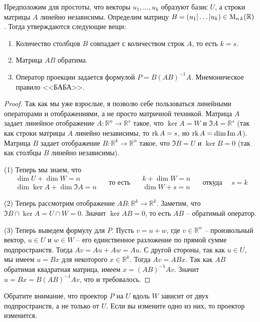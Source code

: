 Предположим для простоты, что векторы $u_1,\ldots,u_k$ образуют базис $U$, а строки матрицы $A$ линейно независимы. Определим матрицу $B = (u_1|\ldots|u_k)\in \operatorname{M}_{n\,k}(\mathbb R)$. Тогда утверждаются следующие вещи:
\begin{enumerate}
\item Количество столбцов $B$ совпадает с количеством строк $A$, то есть $k = s$.
\item Матрица $AB$ обратима.
\item Оператор проекции задается формулой $P = B(AB)^{-1}A$. Мнемоническое правило <<БАБА>>.
\end{enumerate}
\begin{proof}
Так как мы уже взрослые, я позволю себе пользоваться линейными операторами и отображениями, а не просто матричной техникой. Матрица $A$ задает линейное отображение $A\colon \mathbb R^n \to \mathbb R^s$ такое, что $\ker A = W$ и $\Im A = \mathbb R^s$ (так как строки матрицы $A$ линейно независимы, то $\operatorname{rk} A = s$, но $\operatorname{rk} A = \dim \operatorname{Im} A$). Матрица $B$ задает отображение $B\colon \mathbb R^k \to \mathbb R^n$ такое, что $\Im B = U$ и $\ker B = 0$ (так как столбцы $B$ линейно независимы). 

(1) Теперь мы знаем, что 
\[
\begin{aligned}
\dim U + \dim W = n\\
\dim \ker A + \dim \Im A = n
\end{aligned}
\quad\text{ то есть }\quad
\begin{aligned}
k + \dim W = n\\
\dim W+ s= n
\end{aligned}
\quad\text{ откуда }\quad
s = k
\]

(2) Теперь рассмотрим отображение $AB\colon \mathbb R^k \to \mathbb R^k$. Заметим, что $\Im B \cap \ker A = U \cap W = 0$. Значит $\ker AB = 0$, то есть $AB$ -- обратимый оператор.

(3) Теперь выведем формулу для $P$. Пусть $v = u + w$, где $v\in \mathbb R^n$ -- произвольный вектор, $u\in U$ и $w\in W$ -- его единственное разложение по прямой сумме подпространств. Тогда $Av = Au + Aw = Au$. С другой стороны, так как $u\in U$, мы имеем $u = B x$ для некоторого $x\in \mathbb R^k$. Тогда $Av = ABx$. Так как $AB$ обратимая квадратная матрица, имеем $x = (AB)^{-1}Av$. Значит $u = Bx = B(AB)^{-1}Av$, что и требовалось.
\end{proof}

Обратите внимание, что проектор $P$ на $U$ вдоль $W$ зависит от двух подпространств, а не только от $U$. Если вы измените одно из них, то проектор изменится.

